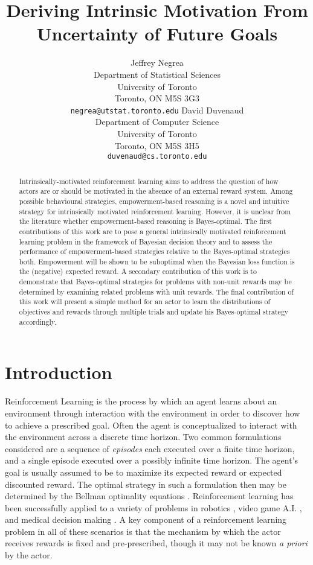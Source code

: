 \documentclass{article}
\title{Deriving Intrinsic Motivation From Uncertainty of Future Goals}
\author{
 Jeffrey Negrea\\
 Department of Statistical Sciences\\
 University of Toronto\\
 Toronto, ON M5S 3G3\\
 \texttt{negrea@utstat.toronto.edu}
 \And
 David Duvenaud\\
 Department of Computer Science\\
 University of Toronto\\
 Toronto, ON M5S 3H5\\
 \texttt{duvenaud@cs.toronto.edu}
}
\begin{document}
\maketitle

\begin{abstract}
Intrinsically-motivated reinforcement learning aims to address the question of how actors are or should be motivated in the absence of an external reward system. 
Among possible behavioural strategies, empowerment-based reasoning is a novel and intuitive strategy for intrinsically motivated reinforcement learning. 
However, it is unclear from the literature whether empowerment-based reasoning is Bayes-optimal.
The first contributions of this work are to pose a general intrinsically motivated reinforcement learning problem in the framework of Bayesian decision theory and to assess the performance of empowerment-based strategies relative to the Bayes-optimal strategies both. 
Empowerment will be shown to be suboptimal when the Bayesian loss function is the (negative) expected reward. 
A secondary contribution of this work is to demonstrate that Bayes-optimal strategies  for problems with non-unit rewards may be determined by examining related problems with unit rewards.  The final contribution of this work will present a simple method for an actor to learn the distributions of objectives and rewards through multiple trials and update his Bayes-optimal strategy accordingly. 
\end{abstract}

\section{Introduction}
Reinforcement Learning is the process by which an agent learns about an environment through interaction with the environment in order to discover how to achieve a prescribed goal. Often the agent is conceptualized to interact with the environment across a discrete time horizon. Two common formulations considered are a sequence of \textit{episodes} each executed over a finite time horizon, and a single episode executed over a possibly infinite time horizon. The agent's goal is usually assumed to be to maximize its expected reward or expected discounted reward. The optimal strategy in such a formulation then may be determined by the Bellman optimality equations \cite{sutton1998reinforcement}. Reinforcement learning has been successfully applied to a variety of problems in robotics \cite{mcallister2016data,finn2016deep,christiano2016transfer}, video game A.I. \cite{mnih2015human}, and medical decision making \cite{krishnan2016structured}. A key component of a reinforcement learning problem in all of these scenarios is that the mechanism by which the actor receives rewards is fixed and pre-prescribed, though it may not be known \textit{a priori} by the actor.
\end{document}
